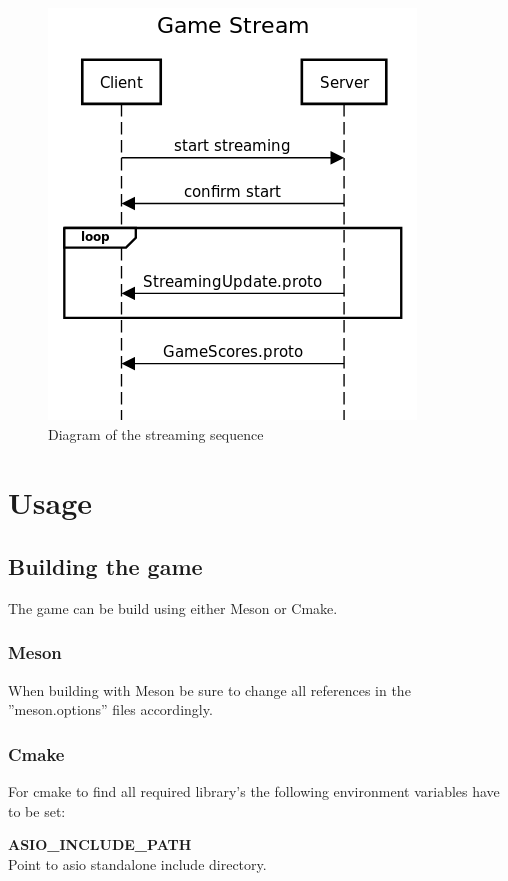 \documentclass[12pt]{report}
\begin{document}
\begin{figure}[h]
\centering
\includegraphics[scale = 0.5]{sequence_diagrm.png}
\caption{Diagram of the streaming sequence}
\medskip
\end{figure}

\section{Usage}

\subsection{Building the game}

The game can be build using either Meson or Cmake.

\subsubsection{Meson}
When building with Meson be sure to change all references in the ''meson.options'' files accordingly.

\subsubsection{Cmake}
For cmake to find all required library's the following environment variables have to be set:

\textbf{ASIO\_INCLUDE\_PATH} \\
Point to asio standalone include directory.
\end{document}
